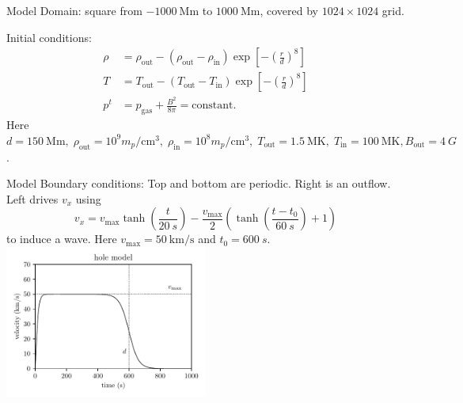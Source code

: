 \documentclass{beamer}
\begin{document}
\begin{frame}{Model}
	Domain: square from $\SI{-1000}{\mega \metre}$ to $\SI{1000}{\mega\metre}$, covered by $1024 \times  1024$ grid. 

\medskip

	Initial conditions:
	\begin{align*}
		\rho &= \rho _\text{out} -(\rho_\text{out}  - \rho_\text{in} )\exp\left[ -\left( \frac{r}{d} \right) ^{8} \right]  \\
		T &= T_\text{out}  - (T_\text{out}  - T_\text{in} )\exp\left[ -\left( \frac{r}{d} \right)^{8}  \right] \\
		p^{t} &= p_\text{gas} + \frac{B^2}{8 \pi} = \text{constant}
	.\end{align*}
	Here $d = \SI{150}{\mega\metre},\; \rho_\text{out}  = 10^{9}m_p \si{\per \centi\metre\cubed},\; \rho_\text{in}  = 10^{8}m_p \si{\per \centi\metre\cubed},\; T_\text{out}  = \SI{1.5}{\mega\kelvin},\; T_\text{in}  = \SI{100}{\mega\kelvin}, B_\text{out}  = \SI{4}{G}$.
\end{frame}
\begin{frame}{Model}
	Boundary conditions: Top and bottom are periodic. Right is an outflow. Left drives $v_x$ using \[
		v_x = v_\text{max} \tanh\left( \frac{t}{\SI{20}{s}} \right) - \frac{v_\text{max} }{2}\left( \tanh\left( \frac{t - t_0}{\SI{60}{s}} \right) + 1 \right) 
	\] 
	to induce a wave. 
	Here $v_\text{max}  = \SI{50}{\kilo\metre\per\second}$ and $t_0 = \SI{600}{s}$.\\
	\centering
		\includegraphics[width=0.5\textwidth]{figures/wave_drive.pdf}
\end{frame}
\end{document}
